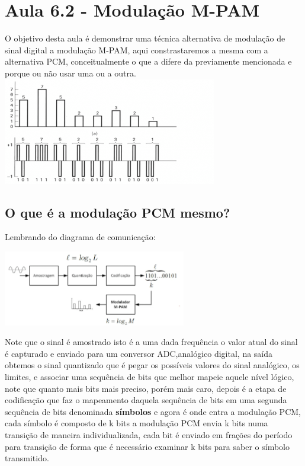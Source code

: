 
\section{Aula 6.2 - Modulação M-PAM}

O objetivo desta aula é demonstrar uma técnica alternativa de modulação de sinal digital a modulação M-PAM, aqui constrastaremos a mesma com a alternativa PCM, conceitualmente
o que a difere da previamente mencionada e porque ou não usar uma ou a outra.
\\

\includegraphics[width=0.7\textwidth]{../assets/mpam.png}\cite{dc}

\subsection{O que é a modulação PCM mesmo?}

Lembrando do diagrama de comunicação:


\includegraphics[width=0.6\textwidth]{../assets/diagramacomm.png}\cite{dc}


Note que o sinal é amostrado isto é a uma dada frequência o valor atual do sinal é capturado e enviado para um conversor ADC,analógico digital, na saída obtemos o sinal quantizado
que é pegar os possíveis valores do sinal analógico, os limites, e associar uma sequência de bits que melhor mapeie aquele nível lógico, note que quanto mais bits mais preciso,
porém mais caro, depois é a etapa de codificação que faz o mapeamento daquela sequência de bits em uma segunda sequência de bits denominada \textbf{símbolos} e agora é onde entra
a modulação PCM, cada símbolo é composto de k bits a modulação PCM envia k bits numa transição de maneira individualizada, cada bit é enviado em frações do período para transição
de forma que é necessário examinar k bits para saber o símbolo transmitido.

